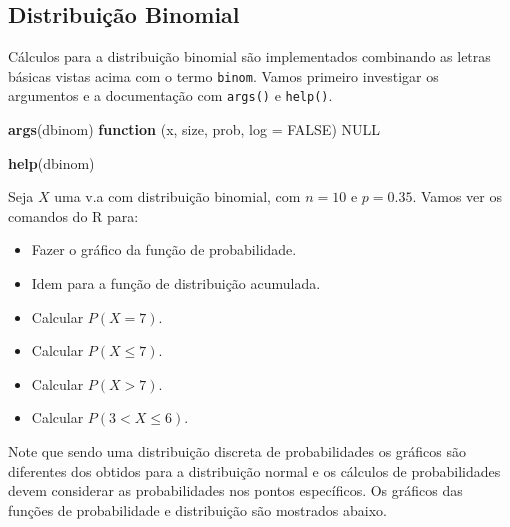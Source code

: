 \documentclass[10pt,a4paper]{book}
\newenvironment{Shaded}{\begin{snugshade}}{\end{snugshade}}
\newcommand{\KeywordTok}[1]{\textcolor[rgb]{0.13,0.29,0.53}{\textbf{#1}}}
\newcommand{\DataTypeTok}[1]{\textcolor[rgb]{0.13,0.29,0.53}{#1}}
\newcommand{\OtherTok}[1]{\textcolor[rgb]{0.56,0.35,0.01}{#1}}
\newcommand{\ControlFlowTok}[1]{\textcolor[rgb]{0.13,0.29,0.53}{\textbf{#1}}}
\newcommand{\NormalTok}[1]{#1}
\providecommand{\tightlist}{%
  \setlength{\itemsep}{0pt}\setlength{\parskip}{0pt}}
\begin{document}
\subsection{Distribuição Binomial}\label{distribuiuxe7uxe3o-binomial}

Cálculos para a distribuição binomial são implementados combinando as
letras básicas vistas acima com o termo \texttt{binom}. Vamos primeiro
investigar os argumentos e a documentação com \texttt{args()} e
\texttt{help()}.

\begin{Shaded}
\begin{Highlighting}[]
\KeywordTok{args}\NormalTok{(dbinom)}
\ControlFlowTok{function}\NormalTok{ (x, size, prob, }\DataTypeTok{log =} \OtherTok{FALSE}\NormalTok{) }
\OtherTok{NULL}
\end{Highlighting}
\end{Shaded}

\begin{Shaded}
\begin{Highlighting}[]
\KeywordTok{help}\NormalTok{(dbinom)}
\end{Highlighting}
\end{Shaded}

Seja \(X\) uma v.a com distribuição binomial, com \(n=10\) e \(p=0.35\).
Vamos ver os comandos do R para:

\begin{itemize}
\tightlist
\item
  Fazer o gráfico da função de probabilidade.
\item
  Idem para a função de distribuição acumulada.
\item
  Calcular \(P(X = 7)\).
\item
  Calcular \(P(X \leq 7)\).
\item
  Calcular \(P(X > 7)\).
\item
  Calcular \(P(3 < X \leq 6)\).
\end{itemize}

Note que sendo uma distribuição discreta de probabilidades os gráficos
são diferentes dos obtidos para a distribuição normal e os cálculos de
probabilidades devem considerar as probabilidades nos pontos
específicos. Os gráficos das funções de probabilidade e distribuição são
mostrados abaixo.
\end{document}
